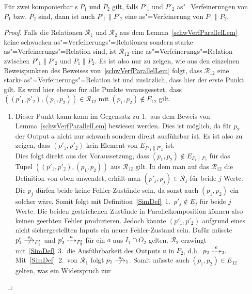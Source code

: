 \begin{Kor}
  \label{verfParallelKor}
  Für zwei komponierbar \MEIO{}s $P_1$ und $P_2$ gilt, falls $P'_1$ und $P'_2$
  as"=Verfeinerungen von $P_1$ bzw. $P_2$ sind, dann ist auch $P'_1\|P'_2$ eine
  as"=Verfeinerung von $P_1\|P_2$.
\end{Kor}
\begin{proof}
  Falls die Relationen $\mathcal{R}_1$ und $\mathcal{R}_2$ aus dem
  Lemma~\ref{schwVerfParallelLem} keine schwachen as"=Verfeinerungs"=Relationen
  sondern starke as"=Verfeinerungs"=Relation sind, ist $\mathcal{R}_{12}$ eine
  as"=Verfeinerungs"=Relation zwischen $P'_1\|P'_2$ und $P_1\|P_2$. Es ist also
  nur zu zeigen, wie aus den einzelnen Beweispunkten des Beweises
  von~\ref{schwVerfParallelLem} folgt, dass $\mathcal{R}_{12}$ eine starke
  as"=Verfeinerungs"=Relation ist und zusätzlich, dass hier der erste Punkt
  gilt. Es wird hier ebenso für alle Punkte vorausgesetzt, dass
  $((p'_1,p'_2),(p_1,p_2))\in\mathcal{R}_{12}$ mit $(p_1,p_2)\notin E_{12}$
  gilt.
  \begin{enumerate}
    \item Dieser Punkt kann kann im Gegensatz zu 1.\ aus dem Beweis von
      Lemma~\ref{schwVerfParallelLem} bewiesen werden. Dies ist möglich, da für
      $p_2$ der Output $a$ nicht nur schwach sondern direkt ausführbar ist. Es
      ist also zu zeigen, dass $(p'_1,p'_2)$ kein Element von $E_{P'_1\|P'_2}$
      ist.\\
      Dies folgt direkt aus der Voraussetzung, dass $(p_1,p_2)\notin
      E_{P_1\|P_2}$ für das Tupel $((p'_1,p'_2),(p_1,p_2))$ aus
      $\mathcal{R}_{12}$ gilt. In dem man auf das $\mathcal{R}_{12}$ die
      Definition von oben anwendet, erhält man $(p'_j,p_j)\in\mathcal{R}_j$ für
      beide $j$ Werte. Die $p_j$ dürfen beide keine Fehler-Zustände sein, da
      sonst auch $(p_1,p_2)$ ein solcher wäre. Somit folgt mit
      Definition~\ref{SimDef}~1.\ $p'_j\notin E_j$ für beide $j$ Werte. Die
      beiden gestrichenen Zustände in Parallelkomposition können also keinen
      geerbten Fehler produzieren. Jedoch könnte $(p'_1,p'_2)$ aufgrund eines
      nicht sichergestellten Inputs ein neuer Fehler-Zustand sein. Dafür müsste
      \oBdA{} $p'_1\nmust[a]_{P'_1}$ und $p'_2\may[a]_{P'_2}$ für ein $a$ aus
      $I_1\cap O_2$ gelten. $\mathcal{R}_2$ erzwingt mit~\ref{SimDef}~3.\ die
      Ausführbarkeit des Outputs $a$ in $P_2$, d.h.\ $p_2 \may[a]_2$.
      Mit~\ref{SimDef}~2.\ von $\mathcal{R}_1$ folgt $p_1 \nmust[a]_1$. Somit
      müsste auch $(p_1,p_2)\in E_{12}$ gelten, was ein Widerspruch zur

\end{enumerate}
\end{proof}
